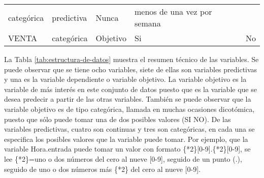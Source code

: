 \documentclass[]{book}
\begin{document}
\begin{longtable}[]{@{}lllll@{}}
\begin{minipage}[t]{0.06\columnwidth}
categórica\strut
\end{minipage} & \begin{minipage}[t]{0.06\columnwidth}\raggedright\strut
predictiva\strut
\end{minipage} & \begin{minipage}[t]{0.42\columnwidth}\raggedright\strut
Nunca\strut
\end{minipage} & \begin{minipage}[t]{0.27\columnwidth}\raggedright\strut
menos de una vez por semana\strut
\end{minipage}\tabularnewline
\begin{minipage}[t]{0.06\columnwidth}\raggedright\strut
VENTA\strut
\end{minipage} & \begin{minipage}[t]{0.06\columnwidth}\raggedright\strut
categórica\strut
\end{minipage} & \begin{minipage}[t]{0.06\columnwidth}\raggedright\strut
Objetivo\strut
\end{minipage} & \begin{minipage}[t]{0.42\columnwidth}\raggedright\strut
Si\strut
\end{minipage} & \begin{minipage}[t]{0.27\columnwidth}\raggedright\strut
No\strut
\end{minipage}\tabularnewline
\bottomrule
\end{longtable}

La Tabla \ref{tab:estructura-de-datos} muestra el resumen técnico de las
variables. Se puede observar que se tiene ocho variables, siete de ellas
son variables predictivas y una es la variable dependiente o variable
objetivo. La variable objetivo es la variable de más interés en este
conjunto de datos puesto que es la variable que se desea predecir a
partir de las otras variables. También se puede observar que la variable
objetivo es de tipo categórica, llamada en muchas ocasiones dicotómica,
puesto que sólo puede tomar una de dos posibles valores (SI \textbar{}
NO). De las variables predictivas, cuatro son continuas y tres son
categóricas, en cada una se especifica los posibles valores que la
variable puede tomar. Por ejemplo, que la variable Hora.entrada puede
tomar un valor con formato \{*2\}{[}0-9{]}.\{*2\}{[}0-9{]}, se lee
\{*2\}=uno o dos números del cero al nueve {[}0-9{]}, seguido de un
punto (.), seguido de uno o dos números más \{*2\} del cero al nueve
{[}0-9{]}.
\end{document}
